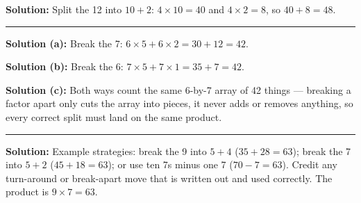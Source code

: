 \documentclass[12pt]{article}
\begin{document}

\textbf{Solution:} Split the 12 into $10 + 2$: $4 \times 10 = 40$ and $4 \times 2 = 8$, so $40 + 8 = 48$. 

\noindent\rule{\linewidth}{0.2pt}


\textbf{Solution (a):} Break the 7: $6 \times 5 + 6 \times 2 = 30 + 12 = 42$. 

\textbf{Solution (b):} Break the 6: $7 \times 5 + 7 \times 1 = 35 + 7 = 42$. 

\textbf{Solution (c):} Both ways count the same 6-by-7 array of 42 things --- breaking a factor apart only cuts the array into pieces, it never adds or removes anything, so every correct split must land on the same product.

\noindent\rule{\linewidth}{0.2pt}


\textbf{Solution:} Example strategies: break the 9 into $5 + 4$ ($35 + 28 = 63$); break the 7 into $5 + 2$ ($45 + 18 = 63$); or use ten 7s minus one 7 ($70 - 7 = 63$). Credit any turn-around or break-apart move that is written out and used correctly. The product is $9 \times 7 = 63$. 
\end{document}
